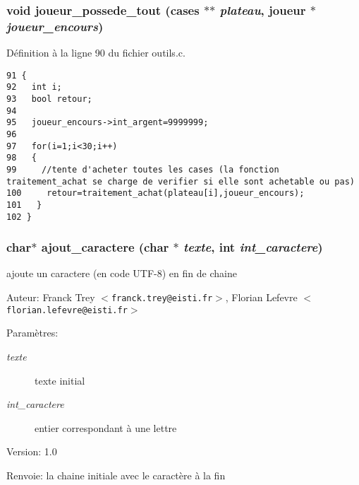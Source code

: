 \subsubsection{\setlength{\rightskip}{0pt plus 5cm}void joueur\_\-possede\_\-tout ({\bf cases} $\ast$$\ast$ {\em plateau}, {\bf joueur} $\ast$ {\em joueur\_\-encours})}\label{outils_8h_39dfce9b2a45da995ceaab0aade1bdf8}




D\'{e}finition \`{a} la ligne 90 du fichier outils.c.

\begin{Code}\begin{verbatim}91 {
92   int i;
93   bool retour;
94   
95   joueur_encours->int_argent=9999999;
96     
97   for(i=1;i<30;i++)
98   {
99     //tente d'acheter toutes les cases (la fonction traitement_achat se charge de verifier si elle sont achetable ou pas)
100     retour=traitement_achat(plateau[i],joueur_encours); 
101   }
102 }
\end{verbatim}\end{Code}


\subsubsection{\setlength{\rightskip}{0pt plus 5cm}char$\ast$ ajout\_\-caractere (char $\ast$ {\em texte}, int {\em int\_\-caractere})}\label{outils_8h_c6601c0d36e455a4c5c53e21dba99163}


ajoute un caractere (en code UTF-8) en fin de chaine 

\begin{Desc}
\item[Auteur:]Franck Trey $<${\tt franck.trey@eisti.fr}$>$, Florian Lefevre $<${\tt florian.lefevre@eisti.fr}$>$\end{Desc}
\begin{Desc}
\item[Param\`{e}tres:]
\begin{description}
\item[{\em texte}]texte initial \item[{\em int\_\-caractere}]entier correspondant \`{a} une lettre\end{description}
\end{Desc}
\begin{Desc}
\item[Version:]1.0 \end{Desc}
\begin{Desc}
\item[Renvoie:]la chaine initiale avec le caract\`{e}re \`{a} la fin \end{Desc}


